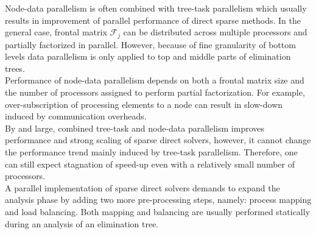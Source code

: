 Node-data parallelism is often combined with tree-task parallelism which usually results in improvement of parallel performance of direct sparse methods. In the general case, frontal matrix $\mathcal{F}_{j}$ can be distributed across multiple processors and partially factorized in parallel. However, because of fine granularity of bottom levels data parallelism is only applied to top  and middle parts of elimination trees.\\ 

Performance of node-data parallelism depends on  both a frontal matrix size and the number of processors assigned to perform partial factorization. For example, over-subscription of processing elements to a node can result in slow-down induced by communication overheads.\\


By and large, combined tree-task and node-data parallelism improves performance and strong scaling of sparse direct solvers, however, it cannot change the performance trend mainly induced by tree-task parallelism. Therefore, one can still expect  stagnation of speed-up even with a relatively small number of processors.\\


A parallel implementation of sparse direct solvers demands to expand the analysis phase by adding 
two more pre-processing steps, namely: process mapping and load balancing. Both mapping and balancing are usually performed statically during an analysis of an elimination tree.\\ %





